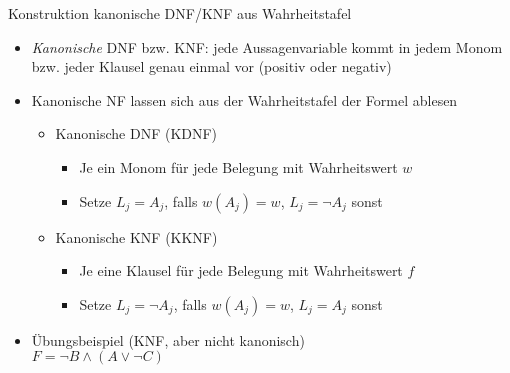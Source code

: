 \begin{frame}{Konstruktion kanonische DNF/KNF aus Wahrheitstafel}
	\begin{itemize}
		\item \emph{Kanonische} DNF bzw. KNF: jede Aussagenvariable kommt in jedem Monom bzw. jeder Klausel genau einmal vor (positiv oder negativ)
		\item Kanonische NF lassen sich aus der Wahrheitstafel der Formel ablesen
		\begin{itemize}
			\item Kanonische DNF (KDNF)
			\begin{itemize}
				\item Je ein Monom für jede Belegung mit Wahrheitswert $w$
				\item Setze $L_j=A_j$, falls $w(A_j)=w$, $L_j=\neg A_j$ sonst
			\end{itemize}
			\item Kanonische KNF (KKNF)
			\begin{itemize}
				\item Je eine Klausel für jede Belegung mit Wahrheitswert $f$
				\item Setze $L_j=\neg A_j$, falls $w(A_j)=w$, $L_j=A_j$ sonst
			\end{itemize}
		\end{itemize}
		\item Übungsbeispiel (KNF, aber nicht kanonisch)\\
		$F=\neg B \land (A \lor \neg C)$
	\end{itemize}
\end{frame}

